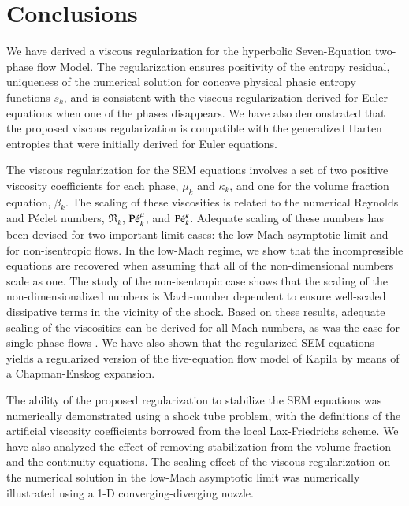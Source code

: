 \documentclass[preprint,10pt]{elsarticle}
\begin{document}
%

\section{Conclusions}\label{sec:conclusion}
%
We have derived a viscous regularization for the hyperbolic Seven-Equation two-phase flow Model. The regularization ensures positivity of the entropy residual, 
uniqueness of the numerical solution for concave physical phasic entropy functions $s_k$, and is consistent with the viscous regularization derived for 
Euler equations when one of the phases disappears. 
We have also demonstrated that the proposed viscous regularization is compatible with the generalized Harten entropies that were initially derived for Euler equations. 

The viscous regularization for the SEM equations involves a set of two positive viscosity coefficients for each phase, $\mu_k$ and $\kappa_k$, and one for the volume 
fraction equation, $\beta_k$. The scaling of these viscosities is related to the numerical Reynolds and P\'eclet numbers, $\Re_k$, $\textrm{P\'e}_k^\mu$, and $\textrm{P\'e}_k^\kappa$. 
Adequate scaling of these numbers has been devised for two important limit-cases: the low-Mach asymptotic limit and for non-isentropic flows. In the low-Mach regime, 
we show that the incompressible equations are recovered when assuming that all of the non-dimensional numbers scale as one. The study of the non-isentropic case 
shows that the scaling of the non-dimensionalized numbers is Mach-number dependent to ensure well-scaled dissipative terms in the vicinity of the shock.
Based on these results, adequate scaling of the viscosities can be derived for all Mach numbers, as was the case for single-phase flows \cite{Marco_paper_low_mach}. 
%
We have also shown that the regularized SEM equations yields a regularized version of the five-equation flow model of Kapila by means of a Chapman-Enskog expansion.

The ability of the proposed regularization to stabilize the SEM equations was numerically demonstrated using a shock tube problem, with the definitions of the 
artificial viscosity coefficients borrowed from the local Lax-Friedrichs scheme. We have also analyzed the effect of removing stabilization from the volume fraction 
and the continuity equations. The scaling effect of the viscous regularization on the numerical solution in the low-Mach asymptotic limit was numerically illustrated using a 1-D converging-diverging nozzle.
\end{document}
